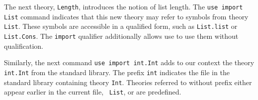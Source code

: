 The next theory, \texttt{Length}, introduces the notion of list
length. The \texttt{use import List} command indicates that this new
theory may refer to symbols from theory \texttt{List}. These symbols
are accessible in a qualified form, such as \texttt{List.list} or
\texttt{List.Cons}. The \texttt{import} qualifier additionally allows
use to use them without qualification.

Similarly, the next command \texttt{use import int.Int} adds to our
context the theory \texttt{int.Int} from the standard library. The
prefix \texttt{int} indicates the file in the standard library
containing theory \texttt{Int}. Theories referred to without prefix
either appear earlier in the current file, \eg\ \texttt{List}, or are
predefined. 





